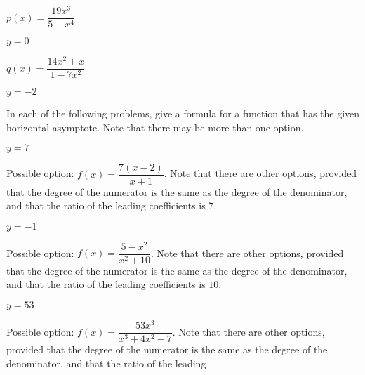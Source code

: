 \begin{exercises}
\begin{problem}
\begin{multicols}{3}
    \begin{subproblem}
        $p(x)=\dfrac{19x^3}{5-x^4}$ 
        \begin{shortsolution}
        $y=0$
        \end{shortsolution}
    \end{subproblem}
    \begin{subproblem}
        $q(x)=\dfrac{14x^2+x}{1-7x^2}$ 
        \begin{shortsolution}
        $y=-2$
        \end{shortsolution}
    \end{subproblem}
\end{multicols}
\end{problem}

\begin{problem}
In each of the following problems, give a formula for a function that 
has the given horizontal asymptote. Note that there may be more than one option.
\begin{multicols}{4}
    \begin{subproblem}
        $y=7$ 
        \begin{shortsolution}
        Possible option: $f(x)=\dfrac{7(x-2)}{x+1}$. Note that there
        are other options, provided that the degree of the numerator is the same as the degree
        of the denominator, and that the ratio of the leading 
        coefficients is $7$.
        \end{shortsolution}
    \end{subproblem}
    \begin{subproblem}
        $y=-1$ 
        \begin{shortsolution}
        Possible option: $f(x)=\dfrac{5-x^2}{x^2+10}$. Note that there
        are other options, provided that the degree of the numerator is the same as the degree
        of the denominator, and that the ratio of the leading 
        coefficients is $10$.
        \end{shortsolution}
    \end{subproblem}
    \begin{subproblem}
        $y=53$ 
        \begin{shortsolution}
        Possible option: $f(x)=\dfrac{53x^3}{x^3+4x^2-7}$. Note that there
        are other options, provided that the degree of the numerator is the same as the degree
        of the denominator, and that the ratio of the leading 

\end{shortsolution}
\end{subproblem}
\end{multicols}
\end{problem}
\end{exercises}
